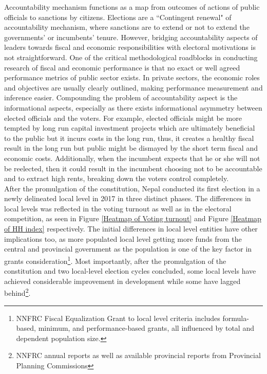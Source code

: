 Accountability mechanism functions as a map from outcomes of actions of public officials to sanctions by citizens. Elections are a ``Contingent renewal" of accountability mechanism, where sanctions are to extend or not to extend the governments' or incumbents' tenure\cite{Przeworski1999}. However, bridging accountability aspects of leaders towards fiscal and economic responsibilities with electoral motivations is not straightforward. One of the critical methodological roadblocks in conducting research of fiscal and economic performance is that no exact or well agreed performance metrics of public sector exists\cite{Estrella2003, Andrews2003, Uphoff2005}. In private sectors, the economic roles and objectives are usually clearly outlined, making performance measurement and inference easier. Compounding the problem of accountability aspect is the informational aspects, especially as there exists informational asymmetry between elected officials and the voters. For example, elected officials might be more tempted by long run capital investment projects which are ultimately beneficial to the public but it incurs costs in the long run, thus, it creates a healthy fiscal result in the long run but public might be dismayed by the short term fiscal and economic costs. Additionally, when the incumbent expects that he or she will not be reelected, then it could result in the incumbent choosing not to be accountable and to extract high rents, breaking down the voters control completely\cite{Ferejohn1986, Banks1998}.   \\
After the promulgation of the constitution, Nepal conducted its first election in a newly delineated local level in 2017 in three distinct phases. The differences in local levels was reflected in the voting turnout as well as in the electoral competition, as seen in Figure \ref{Heatmap of Voting turnout} and Figure \ref{Heatmap of HH index} respectively. The initial differences in local level entities have other implications too, as more populated local level getting more funds from the central and provincial government as the population is one of the key factor in grants consideration\footnote{NNFRC Fiscal Equalization Grant to local level criteria includes formula-based, minimum, and performance-based grants, all influenced by total and dependent population size.}. Most importantly, after the promulgation of the constitution and two local-level election cycles concluded, some local levels have achieved considerable improvement in development while some have lagged behind\footnote{NNFRC annual reports as well as available provincial reports from Provincial Planning Commissions}. 
